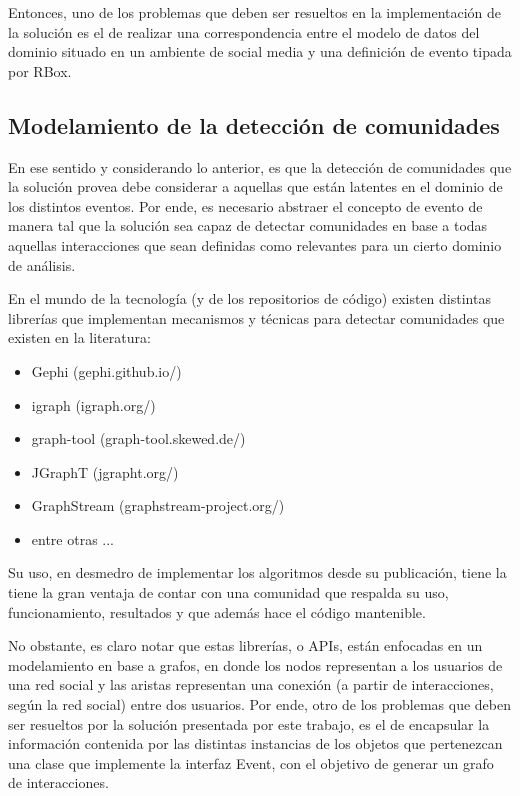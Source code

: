 Entonces, uno de los problemas que deben ser resueltos en la implementación de la solución es el de realizar una correspondencia entre el modelo de datos del dominio situado en un ambiente de social media y una definición de evento tipada por RBox.

\subsection{Modelamiento de la detección de comunidades}

En ese sentido y considerando lo anterior, es que la detección de comunidades que la solución provea debe considerar a aquellas que están latentes en el dominio de los distintos eventos. Por ende, es necesario abstraer el concepto de evento de manera tal que la solución sea capaz de detectar comunidades en base a todas aquellas interacciones que sean definidas como relevantes para un cierto dominio de análisis. 

En el mundo de la tecnología (y de los repositorios de código) existen distintas librerías que implementan mecanismos y técnicas para detectar comunidades que existen en la literatura:

\begin{itemize}
	\item Gephi (gephi.github.io/)
	\item igraph (igraph.org/)
	\item graph-tool (graph-tool.skewed.de/)
	\item JGraphT (jgrapht.org/)
	\item GraphStream (graphstream-project.org/)
	\item entre otras ... 
\end{itemize}

Su uso, en desmedro de implementar los algoritmos desde su publicación, tiene la tiene la gran ventaja de contar con una comunidad que respalda su uso, funcionamiento, resultados y que además hace el código mantenible.

No obstante, es claro notar que estas librerías, o APIs, están enfocadas en un modelamiento en base a grafos, en donde los nodos representan a los usuarios de una red social y las aristas representan una conexión (a partir de interacciones, según la red social) entre dos usuarios. Por ende, otro de los problemas que deben ser resueltos por la solución presentada por este trabajo, es el de encapsular la información contenida por las distintas instancias de los objetos que pertenezcan una clase que implemente la interfaz Event, con el objetivo de generar un grafo de interacciones.

